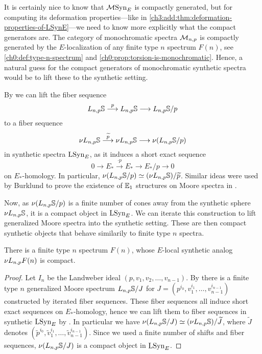 It is certainly nice to know that $\mathcal{M}\mathrm{Syn}_{E}$ is compactly generated, but for computing its deformation properties---like in \cref{ch3:add:thm:deformation-properties-of-LSynE}---we need to know more explicitly what the compact generators are. The category of monochromatic spectra $\mathcal{M}_{n,p}$ is compactly generated by the $E$-localization of any finite type $n$ spectrum $F(n)$, see \cref{ch0:def:type-n-spectrum} and \cref{ch0:prop:torsion-is-monochromatic}. Hence, a natural guess for the compact generators of monochromatic synthetic spectra would be to lift these to the synthetic setting. 

\begin{construction}
    By \cite[4.23]{pstragowski_2022} we can lift the fiber sequence 
    \[L_{n,p}\mathbb{S}\overset{p}{\longrightarrow} L_{n,p}\mathbb{S}\longrightarrow L_{n,p}\mathbb{S}/p\] 
    to a fiber sequence 
    \[\nu L_{n,p}\mathbb{S} \overset{\widetilde{p}}{\longrightarrow} \nu L_{n,p}\mathbb{S}\longrightarrow \nu (L_{n,p}\mathbb{S}/p)\] 
    in synthetic spectra $\mathrm{LSyn}_{E}$, as it induces a short exact sequence 
    \[0\to E_{*} \overset{\cdot p}\to E_{*}\to E_{*}/p\to 0\]
    on $E_{*}$-homology. In particular, $\nu (L_{n,p}\mathbb{S}/p)\simeq (\nu L_{n,p}\mathbb{S})/\widetilde{p}$. Similar ideas were used by Burklund to prove the existence of $\mathbb{E}_1$ structures on Moore spectra in \cite{burklund_2022}. 
    
    Now, as $\nu (L_{n,p}\mathbb{S}/p)$ is a finite number of cones away from the synthetic sphere $\nu L_{n,p} \mathbb{S}$, it is a compact object in $\mathrm{LSyn}_{E}$. We can iterate this construction to lift generalized Moore spectra into the synthetic setting. These are then compact synthetic objects that behave similarily to finite type $n$ spectra. 
\end{construction}

\begin{lemma}
    There is a finite type $n$ spectrum $F(n)$, whose $E$-local synthetic analog $\nu L_{n,p} F(n)$ is compact. 
\end{lemma}
\begin{proof}
    Let $I_n$ be the Landweber ideal $(p,v_1, v_2, \ldots, v_{n-1})$. By \cite[4.14]{hovey-strickland_99} there is a finite type $n$ generalized Moore spectrum $L_{n,p}\mathbb{S}/J$ for $J=(p^{i_0}, v_1^{i_1}, \ldots, v_{n-1}^{i_{n-1}})$ constructed by iterated fiber sequences. These fiber sequences all induce short exact sequences on $E_{*}$-homology, hence we can lift them to fiber sequences in synthetic $\mathrm{LSyn}_{E}$ by \cite[4.23]{pstragowski_2022}. In particular we have $\nu (L_{n,p}\mathbb{S}/J) \simeq (\nu L_{n,p}\mathbb{S})/\widetilde{J}$, where $\widetilde{J}$ denotes $(\widetilde{p}^{i_0}, \widetilde{v}_1^{i_1}, \ldots, \widetilde{v}_{n-1}^{i_{n-1}})$. Since we used a finite number of shifts and fiber sequences, $\nu (L_{n,p}\mathbb{S}/J)$ is a compact object in $\mathrm{LSyn}_{E}$. 
\end{proof}

